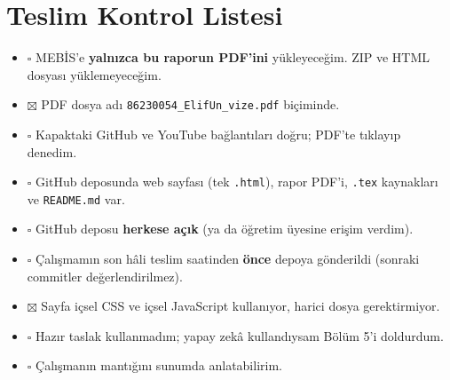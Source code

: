 \documentclass[12pt,a4paper]{article}
\begin{document}
\appendix
\section{Teslim Kontrol Listesi}

\begin{itemize}[label={}]
  \item $\square$ MEBİS'e \textbf{yalnızca bu raporun PDF'ini} yükleyeceğim. ZIP ve HTML dosyası yüklemeyeceğim.
  \item $\boxtimes$ PDF dosya adı \texttt{86230054\_ElifUn\_vize.pdf} biçiminde.
  \item $\square$ Kapaktaki GitHub ve YouTube bağlantıları doğru; PDF'te tıklayıp denedim.
  \item $\square$ GitHub deposunda web sayfası (tek \texttt{.html}), rapor PDF'i, \texttt{.tex} kaynakları ve \texttt{README.md} var.
  \item $\square$ GitHub deposu \textbf{herkese açık} (ya da öğretim üyesine erişim verdim).
  \item $\square$ Çalışmamın son hâli teslim saatinden \textbf{önce} depoya gönderildi (sonraki commitler değerlendirilmez).
  \item $\boxtimes$ Sayfa içsel CSS ve içsel JavaScript kullanıyor, harici dosya gerektirmiyor.
  \item $\square$ Hazır taslak kullanmadım; yapay zekâ kullandıysam Bölüm 5'i doldurdum.
  \item $\square$ Çalışmanın mantığını sunumda anlatabilirim.
\end{itemize}
\end{document}
